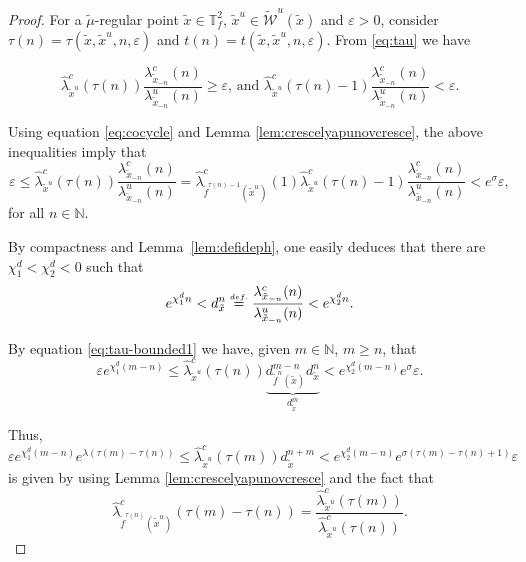 \documentclass[10pt,a4paper]{amsart}
\newcommand{\TTf}{{\mathbb{T}_f^2}}
\newcommand{\cW}{{\mathcal W}}
\newcommand{\eqdef}{\stackrel{\scriptscriptstyle\textrm def.}{=}}
\newcommand{\tix}{\tilde{x}}
\newcommand{\w}{\widetilde{\cW}}
\begin{document}
\begin{proof}
    For a $\tilde{\mu}$-regular point $\tix \in \TTf$, $\tix^u \in \w^u(\tix)$ and $\varepsilon > 0$, consider $\tau(n) = \tau(\tix, \tix^u, n, \varepsilon)$ and $t(n) = t(\tix, \tix^u, n, \varepsilon)$. From \eqref{eq:tau} we have

    $$\hat{\lambda}^c_{\tix^u}(\tau(n)) \frac{\lambda^c_{\tix_{-n}}(n)}{\lambda^u_{\tix_{-n}}(n)} \geq \varepsilon \mbox{, and } \hat{\lambda}^c_{\tix^u}(\tau(n)-1) \frac{\lambda^c_{\tix_{-n}}(n)}{\lambda^u_{\tix_{-n}}(n)} < \varepsilon.$$

    Using equation \eqref{eq:cocycle} and Lemma \ref{lem:crescelyapunovcresce}, the above inequalities imply that
    \begin{equation}
        \label{eq:tau-bounded1}
        \varepsilon \leq \hat{\lambda}^c_{\tix^u}(\tau(n)) \frac{\lambda^c_{\tix_{-n}}(n)}{\lambda^u_{\tix_{-n}}(n)} = \hat{\lambda}^c_{\tilde{f}^{\tau(n) - 1}(\tix^u)}(1) \hat{\lambda}^c_{\tix^u}(\tau(n) - 1) \frac{\lambda^c_{\tix_{-n}}(n)}{\lambda^u_{\tix_{-n}}(n)} < e^\sigma \varepsilon,
    \end{equation}
    for all $n \in \mathbb{N}$.

    By compactness and Lemma~\ref{lem:defideph}, one easily deduces that there are $\chi_1^d < \chi_2^d < 0$ such that $$e^{\chi_1^dn} < d^n_{\tix} \eqdef \frac{\lambda^c_{\tix_{-n}}(n)}{\lambda^u_{\tix_{-n}}(n)} < e^{\chi_2^dn}.$$
    
    By equation \eqref{eq:tau-bounded1} we have, given $m \in \mathbb{N}$, $m \geq n$, that
    $$\varepsilon e^{\chi_1^d(m-n)} \leq \hat{\lambda}^c_{\tix^u}(\tau(n)) \underbrace{d^{m-n}_{\tilde{f}^{n}(\tix)}d^{n}_{\tix}}_{d^{m}_{\tix}} < e^{\chi_2^d(m-n)} e^\sigma \varepsilon.$$
    
    Thus,
    \begin{equation}
        \label{eq:tau-bounded2}
        \varepsilon e^{\chi_1^d(m-n)} e^{\lambda(\tau(m) - \tau(n))} \leq \hat{\lambda}^c_{\tix^u}(\tau(m)) d^{n+m}_{\tix} < e^{\chi_2^d(m-n)} e^{\sigma(\tau(m) - \tau(n) + 1)} \varepsilon
    \end{equation}
    is given by using Lemma \ref{lem:crescelyapunovcresce} and the fact that
    $$\hat{\lambda}^c_{\tilde{f}^{\tau(n)}(\tix^u)}(\tau(m) - \tau(n)) = \dfrac{\hat{\lambda}^c_{\tix^u}(\tau(m))}{\hat{\lambda}^c_{\tix^u}(\tau(n))}.$$


\end{proof}
\end{document}
